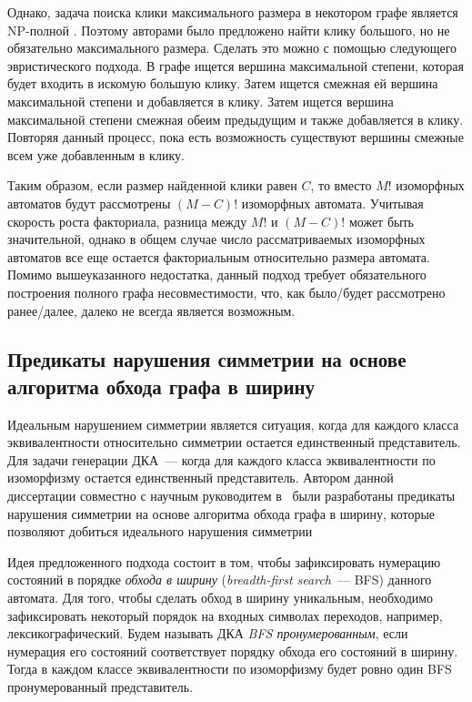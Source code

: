 Однако, задача поиска клики максимального размера в некотором графе является NP-полной .
Поэтому авторами было предложено найти клику большого, но не обязательно максимального размера.
Сделать это можно с помощью следующего эвристического подхода.
В графе ищется вершина максимальной степени, которая будет входить в искомую большую клику.
Затем ищется смежная ей вершина максимальной степени и добавляется в клику.
Затем ищется вершина максимальной степени смежная обеим предыдущим и также добавляется в клику. 
Повторяя данный процесс, пока есть возможность существуют вершины смежные всем уже добавленным в клику.

Таким образом, если размер найденной клики равен $C$, то вместо $M!$ изоморфных автоматов будут рассмотрены $(M - C)!$ изоморфных автомата.
Учитывая скорость роста факториала, разница между $M!$ и $(M - C)!$ может быть значительной, однако в общем случае число рассматриваемых изоморфных автоматов все еще остается факториальным относительно размера автомата.
Помимо вышеуказанного недостатка, данный подход требует обязательного построения полного графа несовместимости, что, как было/будет  рассмотрено ранее/далее, далеко не всегда является возможным.


\subsection{Предикаты нарушения симметрии на основе алгоритма обхода графа в ширину}
\label{sec:review:sym-breaking:bfs-based}

Идеальным нарушением симметрии является ситуация, когда для каждого класса эквивалентности относительно симметрии остается единственный представитель. 
Для задачи генерации ДКА~{---} когда для каждого класса эквивалентности по изоморфизму остается единственный представитель.
Автором данной диссертации совместно с научным руководитем  в~\cite{zakirzyanov2015LATA} были разработаны предикаты нарушения симметрии на основе алгоритма обхода графа в ширину, которые позволяют добиться идеального нарушения симметрии

Идея предложенного подхода состоит в том, чтобы зафиксировать нумерацию состояний в порядке \emph{обхода в ширину} (\emph{breadth-first search}~{---} BFS) данного автомата.
Для того, чтобы сделать обход в ширину уникальным, необходимо зафиксировать некоторый порядок на входных символах переходов, например, лексикографический. 
Будем называть ДКА \emph{BFS пронумерованным}, если нумерация его состояний соответствует порядку обхода его состояний в ширину.
Тогда в каждом классе эквивалентности по изоморфизму будет ровно один BFS пронумерованный представитель.

